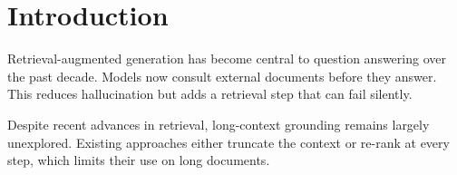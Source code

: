 \section{Introduction}

Retrieval-augmented generation has become central to question answering over the past decade.
Models now consult external documents before they answer.
This reduces hallucination but adds a retrieval step that can fail silently.

Despite recent advances in retrieval, long-context grounding remains largely unexplored.
Existing approaches either truncate the context or re-rank at every step, which limits their use on long documents.
